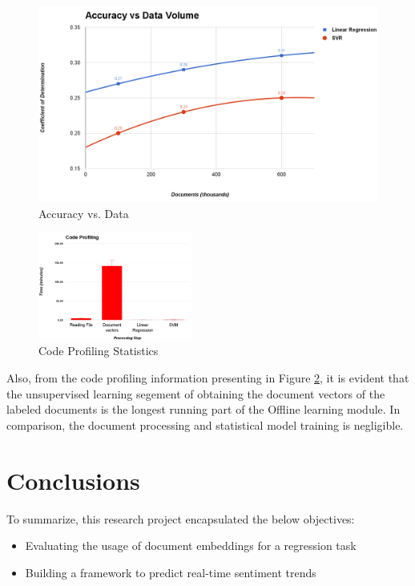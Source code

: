 \documentclass[conference]{IEEEtran}
\begin{document}
    \begin{figure}[ht]
        \centering
        \includegraphics[width=\textwidth]{images/accuracy-vs-data.png}
        \caption{Accuracy vs. Data}
        \label{fig:accuracy-v-data}
    \end{figure}

    \begin{figure}[ht]
        \centering
        \includegraphics[width=0.45\textwidth]{images/code_profiling.png}
        \caption{Code Profiling Statistics}
        \label{fig:code-profiling}
    \end{figure}

    Also, from the code profiling information presenting in Figure \ref{fig:code-profiling}, it is evident that the unsupervised learning segement of obtaining the document vectors of the labeled documents is the longest running part of the Offline learning module. In comparison, the document processing and statistical model training is negligible.

\vspace{5mm}

\section{Conclusions}
To summarize, this research project encapsulated the below objectives:
    \begin{itemize}
        \item Evaluating the usage of document embeddings for a regression task
        \item Building a framework to predict real-time sentiment trends
    \end{itemize}
\end{document}
